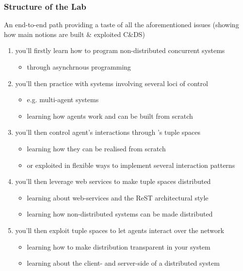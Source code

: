\documentclass[handout]{beamer}\mode<presentation>{\usetheme{AMSCesenaPurpleAndGold}}
\begin{document}
\begin{frame}[allowframebreaks]
	\frametitle{Structure of the Lab}

	An end-to-end path providing a taste of all the aforementioned issues (showing how main notions are built \& exploited C\&DS)
	\medskip
	\begin{enumerate}
		\item you'll firstly learn how to program non-distributed concurrent systems
		\begin{itemize}
			\item through \alert{asynchrnous programming}
		\end{itemize}

		\medskip

		\item you'll then practice with systems involving several loci of control
		\begin{itemize}
			\item e.g. \alert{multi-agent systems}
			\item learning how \jade{} agents work and can be built from scratch
		\end{itemize}

		\medskip

		\item you'll then control agent's interactions through \alert{\linda{}'s tuple spaces}
		\begin{itemize}
			\item learning how they can be realised from scratch
			\item or exploited in flexible ways to implement several \alert{interaction patterns}
		\end{itemize}

		\framebreak

		\item you'll then leverage \alert{web services} to make tuple spaces distributed
		\begin{itemize}
			\item learning about web-services and the ReST architectural style
			\item learning how non-distributed systems can be made distributed
		\end{itemize}

		\medskip

		\item you'll then exploit tuple spaces to let agents interact \alert{over the network}
		\begin{itemize}
			\item learning how to make distribution transparent in your system
			\item learning about the client- and server-side of a distributed system
		\end{itemize}


\end{enumerate}
\end{frame}
\end{document}
